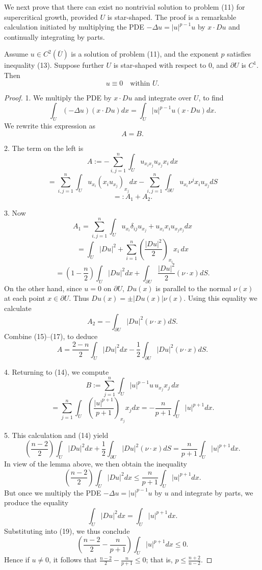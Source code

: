 We next prove that there can exist no nontrivial solution to problem (11) for supercritical growth, provided $U$ is star-shaped. The proof is a remarkable calculation initiated by multiplying the PDE $-\Delta u = |u|^{p-1}u$ by $x \cdot Du$ and continually integrating by parts.

\begin{theorem}
\label{thm:derrick-pohozaev-nonexistence}
Assume $u \in C^2(\overline{U})$ is a solution of problem (11), and the exponent $p$ satisfies inequality (13). Suppose further $U$ is star-shaped with respect to 0, and $\partial U$ is $C^1$. Then
\[
u \equiv 0 \quad \text{within } U.
\]
\end{theorem}
\begin{proof}
1. We multiply the PDE by $x \cdot Du$ and integrate over $U$, to find
\[
\int_U (-\Delta u)(x \cdot Du) dx = \int_U |u|^{p-1}u(x \cdot Du) dx.
\tag{14}
\]
We rewrite this expression as
\[
A = B.
\]

2. The term on the left is
\[
A := -\sum_{i,j=1}^{n}\int_U u_{x_ix_j}u_{x_j}x_i\,dx
\]
\[
= \sum_{i,j=1}^{n}\int_U u_{x_i}(x_iu_{x_j})_{x_j}dx - \sum_{i,j=1}^{n}\int_{\partial U}u_{x_i}\nu^j x_iu_{x_j}dS
\]
\[
=: A_1 + A_2.
\tag{15}
\]

3. Now
\[
A_1 = \sum_{i,j=1}^{n}\int_U u_{x_i}\delta_{ij}u_{x_j} + u_{x_i}x_iu_{x_jx_j}dx
\]
\[
= \int_U|Du|^2 + \sum_{i=1}^{n}\left(\frac{|Du|^2}{2}\right)_{x_i} x_i \, dx
\]
\[
= \left(1 - \frac{n}{2}\right)\int_U|Du|^2dx + \int_{\partial U}\frac{|Du|^2}{2}(\nu \cdot x)dS.
\tag{16}
\]
On the other hand, since $u = 0$ on $\partial U$, $Du(x)$ is parallel to the normal $\nu(x)$ at each point $x \in \partial U$. Thus $Du(x) = \pm|Du(x)|\nu(x)$. Using this equality we calculate
\[
A_2 = -\int_{\partial U}|Du|^2(\nu \cdot x)dS.
\tag{17}
\]
Combine (15)--(17), to deduce
\[
A = \frac{2-n}{2}\int_U|Du|^2dx - \frac{1}{2}\int_{\partial U}|Du|^2(\nu \cdot x)dS.
\]

4. Returning to (14), we compute
\[
B := \sum_{j=1}^{n}\int_U|u|^{p-1}u \, u_{x_j}x_j\,dx
\]
\[
= \sum_{j=1}^{n}\int_U\left(\frac{|u|^{p+1}}{p+1}\right)_{x_j}x_j dx = -\frac{n}{p+1}\int_U|u|^{p+1}dx.
\]

5. This calculation and (14) yield
\[
\left(\frac{n-2}{2}\right)\int_U|Du|^2dx + \frac{1}{2}\int_{\partial U}|Du|^2(\nu \cdot x)dS = \frac{n}{p+1}\int_U|u|^{p+1}dx.
\tag{18}
\]
In view of the lemma above, we then obtain the inequality
\[
\left(\frac{n-2}{2}\right)\int_U |Du|^2 dx \leq \frac{n}{p+1}\int_U |u|^{p+1} dx.
\tag{19}
\]
But once we multiply the PDE $-\Delta u = |u|^{p-1}u$ by $u$ and integrate by parts, we produce the equality
\[
\int_U |Du|^2 dx = \int_U |u|^{p+1} dx.
\]
Substituting into (19), we thus conclude
\[
\left(\frac{n-2}{2} - \frac{n}{p+1}\right)\int_U |u|^{p+1}dx \leq 0.
\]
Hence if $u \neq 0$, it follows that $\frac{n-2}{2} - \frac{n}{p+1} \leq 0$; that is, $p \leq \frac{n+2}{n-2}$.
\end{proof}

